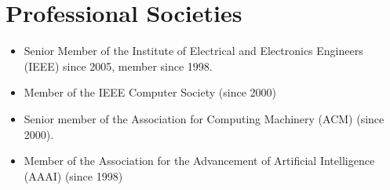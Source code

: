 
\section{Professional Societies}

\begin{itemize}[nosep, noitemsep]
    \item Senior Member of the Institute of Electrical and Electronics
    Engineers (IEEE) since 2005, member since 1998.
    \item Member of the IEEE Computer Society (since 2000) %
    \item Senior member of the Association for Computing Machinery (ACM) (since 2000). %
    \item Member of the Association for the Advancement of Artificial Intelligence
    (AAAI) (since 1998) %
\end{itemize}
